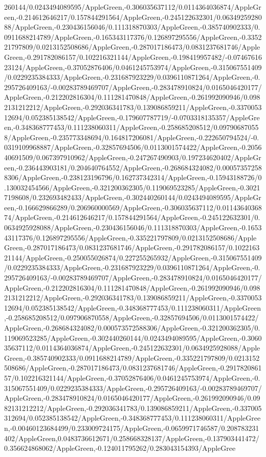 {\begin{tikzternal}
{260144/0.0243494089595/AppleGreen,-0.306035637112/0.0114364036874/AppleGreen,-0.214612646217/0.157844291564/AppleGreen,-0.245122632301/0.0634925928088/AppleGreen,-0.230436156046/0.111318870303/AppleGreen,-0.385740902333/0.0911688214789/AppleGreen,-0.165343117376/0.126897295556/AppleGreen,-0.335221797809/0.0213152508686/AppleGreen,-0.287017186473/0.0831237681746/AppleGreen,-0.291782086157/0.102216321144/AppleGreen,-0.198419957482/-0.0746761623124/AppleGreen,-0.37052876406/0.0461245753974/AppleGreen,-0.315067551409/0.0229235384333/AppleGreen,-0.231687923229/0.0396110871264/AppleGreen,-0.295726409163/-0.00283789469707/AppleGreen,-0.283478910824/0.0165046420177/AppleGreen,-0.212202816304/0.111281470848/AppleGreen,-0.261992090946/0.0982131212212/AppleGreen,-0.292036341783/0.139086859211/AppleGreen,-0.337005312694/0.052385138542/AppleGreen,-0.179607787719/-0.0703318135357/AppleGreen,-0.348368777453/0.111238060311/AppleGreen,-0.258685208512/0.097906870558/AppleGreen,-0.235773348694/0.164817206081/AppleGreen,-0.222650794524/-0.0319109968887/AppleGreen,-0.32857694506/0.0113001574422/AppleGreen,-0.205640691509/0.067397910962/AppleGreen,-0.247267490903/0.197234620402/AppleGreen,-0.236443903181/0.204640764552/AppleGreen,-0.268684324082/0.000573572588306/AppleGreen,-0.238123196796/0.162737342314/AppleGreen,-0.15943188726/0.130032454566/AppleGreen,-0.321200362305/0.119069523285/AppleGreen,-0.30217198608/0.232693482433/AppleGreen,-0.302440260144/0.0243494089595/AppleGreen,-0.166629866289/0.206960000569/AppleGreen,-0.306035637112/0.0114364036874/AppleGreen,-0.214612646217/0.157844291564/AppleGreen,-0.245122632301/0.0634925928088/AppleGreen,-0.230436156046/0.111318870303/AppleGreen,-0.165343117376/0.126897295556/AppleGreen,-0.335221797809/0.0213152508686/AppleGreen,-0.287017186473/0.0831237681746/AppleGreen,-0.291782086157/0.102216321144/AppleGreen,-0.250055026874/0.227255265932/AppleGreen,-0.315067551409/0.0229235384333/AppleGreen,-0.231687923229/0.0396110871264/AppleGreen,-0.295726409163/-0.00283789469707/AppleGreen,-0.283478910824/0.0165046420177/AppleGreen,-0.212202816304/0.111281470848/AppleGreen,-0.261992090946/0.0982131212212/AppleGreen,-0.292036341783/0.139086859211/AppleGreen,-0.337005312694/0.052385138542/AppleGreen,-0.348368777453/0.111238060311/AppleGreen,-0.258685208512/0.097906870558/AppleGreen,-0.32857694506/0.0113001574422/AppleGreen,-0.268684324082/0.000573572588306/AppleGreen,-0.321200362305/0.119069523285/AppleGreen,-0.302440260144/0.0243494089595/AppleGreen,-0.306035637112/0.0114364036874/AppleGreen,-0.245122632301/0.0634925928088/AppleGreen,-0.385740902333/0.0911688214789/AppleGreen,-0.335221797809/0.0213152508686/AppleGreen,-0.287017186473/0.0831237681746/AppleGreen,-0.291782086157/0.102216321144/AppleGreen,-0.37052876406/0.0461245753974/AppleGreen,-0.315067551409/0.0229235384333/AppleGreen,-0.295726409163/-0.00283789469707/AppleGreen,-0.283478910824/0.0165046420177/AppleGreen,-0.261992090946/0.0982131212212/AppleGreen,-0.292036341783/0.139086859211/AppleGreen,-0.337005312694/0.052385138542/AppleGreen,-0.348368777453/0.111238060311/AppleGreen,-0.00460123684499/0.233009724175/AppleGreen,-0.0659971746587/0.208783231402/AppleGreen,0.0483736612671/0.258668328137/AppleGreen,-0.137903441472/0.356624868062/AppleGreen,-0.124011795262/0.283043154393/AppleGree}
\end{tikzternal}}
